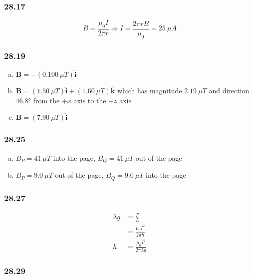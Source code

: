 \documentclass{article}
\begin{document}
\subsubsection{28.17}

\[B = \frac{\mu_0 I}{2 \pi r} \Rightarrow I = \frac{2 \pi r B}{\mu_0} = \qty{25}{\mu A}\]

\subsubsection{28.19}

\begin{enumerate}[(a)]
  \item $\mathbf{B} = -(\qty{0.100}{\mu T}) \hat{\mathbf{i}}$

  \item $\mathbf{B} = (\qty{1.50}{\mu T}) \hat{\mathbf{i}} + (\qty{1.60}{\mu T}) \hat{\mathbf{k}}$ which has magnitude $\qty{2.19}{\mu T}$ and direction $\ang{46.8}$ from the $+x$ axis to the $+z$ axis

  \item $\mathbf{B} = (\qty{7.90}{\mu T}) \hat{\mathbf{i}}$
\end{enumerate}

\subsubsection{28.25}

\begin{enumerate}[(a)]
  \item $B_P = \qty{41}{\mu T}$ into the page, $B_Q = \qty{41}{\mu T}$ out of the page

  \item $B_P = \qty{9.0}{\mu T}$ out of the page, $B_Q = \qty{9.0}{\mu T}$ into the page
\end{enumerate}

\subsubsection{28.27}

\begin{align*}
  \lambda g & = \frac{F}{L}                       \\
            & = \frac{\mu_0 I^2}{2 \pi h}         \\
  h         & = \frac{\mu_0 I^2}{2 \pi \lambda g}
\end{align*}

\subsubsection{28.29}
\end{document}
